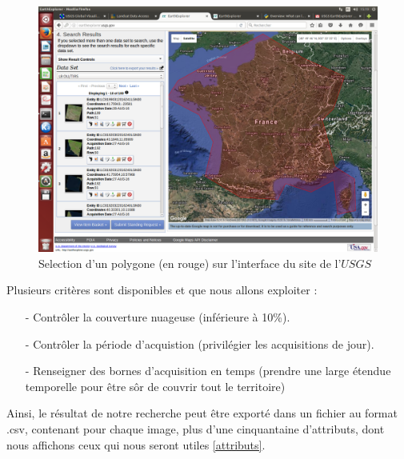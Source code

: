 \documentclass{book}
\begin{document}
\begin{figure}[H]
\begin{center}
\includegraphics[scale=0.3]{images/polygon_selection.png}
\end{center}
\caption{Selection d'un polygone (en rouge) sur l'interface du site de l'$USGS$}
\label{selection}
\end{figure}

\clearpage

Plusieurs critères sont disponibles et que nous allons exploiter :\\

\begin{itemize}

\item[-] Contr\^{o}ler la couverture nuageuse (inférieure à 10\%).
\item[-] Contr\^{o}ler la période d'acquistion (privilégier les acquisitions de jour).
\item[-] Renseigner des bornes d'acquisition en temps (prendre une large étendue temporelle pour être s\^{o}r de couvrir tout le territoire)

\end{itemize}

Ainsi, le résultat de notre recherche peut être exporté dans un fichier au format .csv, contenant pour chaque image, plus d'une 
cinquantaine d'attributs, dont nous affichons ceux qui nous seront utiles \ref{attributs}.\\
\end{document}
